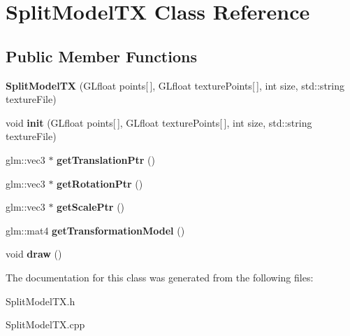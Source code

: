 \hypertarget{class_split_model_t_x}{}\section{Split\+Model\+TX Class Reference}
\label{class_split_model_t_x}
\subsection*{Public Member Functions}
\begin{DoxyCompactItemize}
\item 
\hypertarget{class_split_model_t_x_a686e302388ca57cae346fb334cac0df8}{}\label{class_split_model_t_x_a686e302388ca57cae346fb334cac0df8} 
{\bfseries Split\+Model\+TX} (G\+Lfloat points\mbox{[}$\,$\mbox{]}, G\+Lfloat texture\+Points\mbox{[}$\,$\mbox{]}, int size, std\+::string texture\+File)
\item 
\hypertarget{class_split_model_t_x_a253a153a739823c7b044987f296442c9}{}\label{class_split_model_t_x_a253a153a739823c7b044987f296442c9} 
void {\bfseries init} (G\+Lfloat points\mbox{[}$\,$\mbox{]}, G\+Lfloat texture\+Points\mbox{[}$\,$\mbox{]}, int size, std\+::string texture\+File)
\item 
\hypertarget{class_split_model_t_x_a4278572c6eb4a3ae41b1e970944820ab}{}\label{class_split_model_t_x_a4278572c6eb4a3ae41b1e970944820ab} 
glm\+::vec3 $\ast$ {\bfseries get\+Translation\+Ptr} ()
\item 
\hypertarget{class_split_model_t_x_a34c2dcca2f8398d99033ecdda7f8384a}{}\label{class_split_model_t_x_a34c2dcca2f8398d99033ecdda7f8384a} 
glm\+::vec3 $\ast$ {\bfseries get\+Rotation\+Ptr} ()
\item 
\hypertarget{class_split_model_t_x_a799d8c24bf93e16902fb835715c57aaf}{}\label{class_split_model_t_x_a799d8c24bf93e16902fb835715c57aaf} 
glm\+::vec3 $\ast$ {\bfseries get\+Scale\+Ptr} ()
\item 
\hypertarget{class_split_model_t_x_a0b6b7aeaddb00786a072cffc74d276bb}{}\label{class_split_model_t_x_a0b6b7aeaddb00786a072cffc74d276bb} 
glm\+::mat4 {\bfseries get\+Transformation\+Model} ()
\item 
\hypertarget{class_split_model_t_x_a6ecf010ab19af33c19df13355e19a5f8}{}\label{class_split_model_t_x_a6ecf010ab19af33c19df13355e19a5f8} 
void {\bfseries draw} ()
\end{DoxyCompactItemize}


The documentation for this class was generated from the following files\+:\begin{DoxyCompactItemize}
\item 
Split\+Model\+T\+X.\+h\item 
Split\+Model\+T\+X.\+cpp\end{DoxyCompactItemize}
